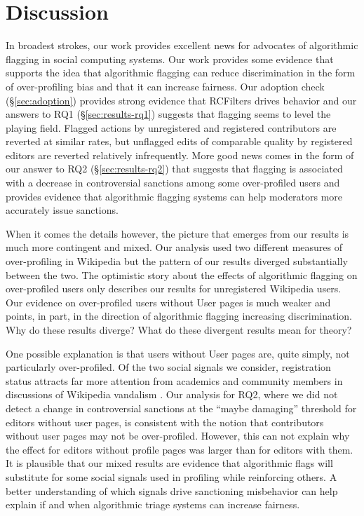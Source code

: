 \documentclass[format=acmsmall, natbib=true,  screen=true]{acmart}
\begin{document}
\section{Discussion}
\label{sec:discussion}


In broadest strokes, our work provides excellent news for advocates of algorithmic flagging in social computing systems. Our work provides some evidence that supports the idea that algorithmic flagging can reduce discrimination in the form of over-profiling bias and that it can increase fairness. Our adoption check (§\ref{sec:adoption}) provides strong evidence that RCFilters drives behavior and our answers to RQ1 (§\ref{sec:results-rq1}) suggests that flagging seems to level the playing field. Flagged actions by unregistered and registered contributors are reverted at similar rates, but unflagged edits of comparable quality by registered editors are reverted relatively infrequently.
More good news comes in the form of our answer to RQ2 (§\ref{sec:results-rq2}) that suggests that flagging is associated with a decrease in controversial sanctions among some over-profiled users and provides evidence that algorithmic flagging systems can help moderators more accurately issue sanctions. 

When it comes the details however, the picture that emerges from our results is much more contingent and mixed. Our analysis used two different measures of over-profiling in Wikipedia but the pattern of our results diverged substantially between the two. The optimistic story about the effects of algorithmic flagging on over-profiled users only describes our results for unregistered Wikipedia users. Our evidence on over-profiled users without User pages is much weaker and points, in part, in the direction of algorithmic flagging increasing discrimination. Why do these results diverge? What do these divergent results mean for theory?

One possible explanation is that users without User pages are, quite simply, not particularly over-profiled. Of the two social signals we consider, registration status attracts far more attention from academics and community members in discussions of Wikipedia vandalism \citep[e.g.,][]{hill_hidden_2020}.
Our analysis for RQ2, where we did not detect a change in controversial sanctions at the ``maybe damaging'' threshold for editors without user pages, is consistent with the notion that contributors without user pages may not be over-profiled. 
However, this can not explain why the effect for editors without profile pages was larger than for editors with them. It is plausible that our mixed results are evidence that algorithmic flags will substitute for some social signals used in profiling while reinforcing others. 
A better understanding of which signals drive sanctioning misbehavior can help explain if and when algorithmic triage systems can increase fairness.
\end{document}
